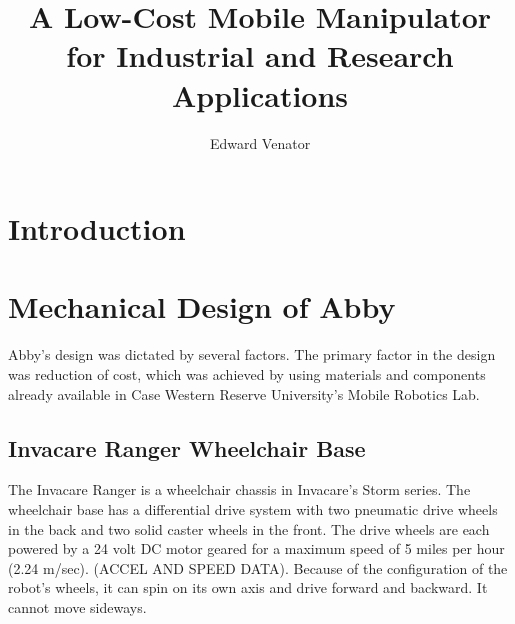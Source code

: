 \documentclass{cwru}
\title{A Low-Cost Mobile Manipulator for Industrial and Research Applications}
\author{Edward Venator}
\begin{document}

\CWRUpreamble{}

\tableofcontents

\section[Introduction]{Introduction}


\section[Mechanical Design of Abby]{Mechanical Design of Abby}
Abby{\textquoteright}s design was dictated by several factors. The primary factor in the design was reduction of cost, which was achieved by using materials and components already available in Case Western Reserve University{\textquoteright}s Mobile Robotics Lab.

\subsection[Invacare Ranger Wheelchair Base]{Invacare Ranger Wheelchair Base}
The Invacare Ranger is a wheelchair chassis in Invacare{\textquoteright}s Storm series. The wheelchair base has a differential drive system with two pneumatic drive wheels in the back and two solid caster wheels in the front. The drive wheels are each powered by a 24 volt DC motor geared for a maximum speed of 5 miles per hour (2.24 m/sec). (ACCEL AND SPEED DATA). Because of the configuration of the robot{\textquoteright}s wheels, it can spin on its own axis and drive forward and backward. It cannot move sideways.
\end{document}
